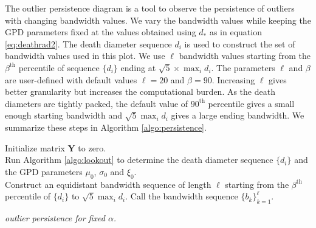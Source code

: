 \documentclass[11pt,a4paper,]{article}
\theoremstyle{definition}
\theoremstyle{definition}
\theoremstyle{definition}
\theoremstyle{remark}
\begin{document}
The outlier persistence diagram is a tool to observe the persistence of outliers with changing bandwidth values. We vary the bandwidth values while keeping the GPD parameters fixed at the values obtained using \(d_*\) as in equation \eqref{eq:deathrad2}. The death diameter sequence \(d_i\) is used to construct the set of bandwidth values used in this plot. We use \(\ell\) bandwidth values starting from the \(\beta^{\text{th}}\) percentile of sequence \(\{d_i\}\) ending at \(\sqrt{5} \times \max_i{d_i}\). The parameters \(\ell\) and \(\beta\) are user-defined with default values \(\ell = 20\) and \(\beta= 90\). Increasing \(\ell\) gives better granularity but increases the computational burden. As the death diameters are tightly packed, the default value of \(90^{\text{th}}\) percentile gives a small enough starting bandwidth and \(\sqrt{5} \max_i{d_i}\) gives a large ending bandwidth.
We summarize these steps in Algorithm \ref{algo:persistence}.

\DontPrintSemicolon
\begin{algorithm}\fontsize{11}{16}\selectfont
    Initialize matrix $\bm{Y}$ to zero. \\
    Run Algorithm \ref{algo:lookout} to determine the death diameter sequence $\{d_i\}$ and the GPD parameters $\mu_0$, $\sigma_0$ and $\xi_0$. \\
    Construct an equidistant bandwidth sequence of length $\ell$ starting from the $\beta^{\text{th}}$ percentile of $\{d_i\}$ to $\sqrt{5} \max_i d_i$. Call the bandwidth sequence $\{b_k\}_{k=1}^{\ell}$. \\
    \caption{\itshape outlier persistence for fixed $\alpha$.}
    \label{algo:persistence}
\end{algorithm}
\end{document}
